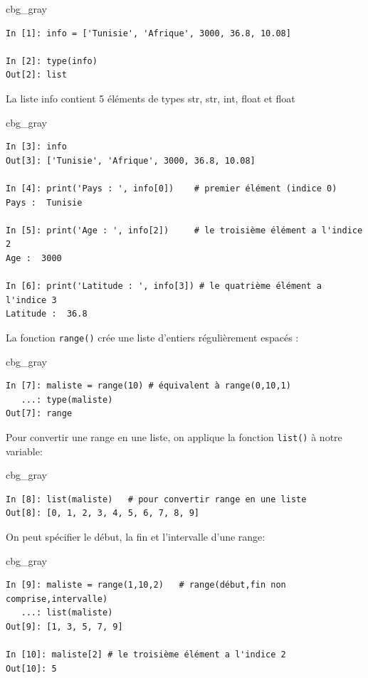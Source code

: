 \documentclass[%
oneside,                 %
final,                   %
10pt]{article}
\newenvironment{_cod_tight}[1]{
   \def\FrameCommand{\colorbox{#1}}
   \FrameRule0.6pt\MakeFramed {\FrameRestore}\vskip3mm}
   {\vskip0mm\endMakeFramed}
\newenvironment{cod}[1]{
\bgroup\rmfamily
\fboxsep=0mm\relax
\begin{_cod_tight}{#1}
\list{}{\parsep=-2mm\parskip=0mm\topsep=0pt\leftmargin=2mm
\rightmargin=2\leftmargin\leftmargin=4pt\relax}
\item\relax}
{\endlist\end{_cod_tight}\egroup}
\begin{document}
\begin{cod}{cbg_gray}\begin{verbatim}
In [1]: info = ['Tunisie', 'Afrique', 3000, 36.8, 10.08]

In [2]: type(info)
Out[2]: list
\end{verbatim}
\end{cod}
\noindent
La liste info contient 5 éléments de types str, str, int, float et float

\begin{cod}{cbg_gray}\begin{verbatim}
In [3]: info
Out[3]: ['Tunisie', 'Afrique', 3000, 36.8, 10.08]

In [4]: print('Pays : ', info[0])    # premier élément (indice 0)
Pays :  Tunisie

In [5]: print('Age : ', info[2])     # le troisième élément a l'indice 2
Age :  3000

In [6]: print('Latitude : ', info[3]) # le quatrième élément a l'indice 3
Latitude :  36.8
\end{verbatim}
\end{cod}
\noindent

La fonction \texttt{range()} crée une liste d'entiers régulièrement espacés :

\begin{cod}{cbg_gray}\begin{verbatim}
In [7]: maliste = range(10) # équivalent à range(0,10,1)
   ...: type(maliste)
Out[7]: range
\end{verbatim}
\end{cod}
\noindent
Pour convertir une range en une liste, on applique la fonction \texttt{list()} à notre variable:
\begin{cod}{cbg_gray}\begin{verbatim}
In [8]: list(maliste)   # pour convertir range en une liste
Out[8]: [0, 1, 2, 3, 4, 5, 6, 7, 8, 9]
\end{verbatim}
\end{cod}
\noindent
On peut spécifier le début, la fin et l'intervalle d'une range:
\begin{cod}{cbg_gray}\begin{verbatim}
In [9]: maliste = range(1,10,2)   # range(début,fin non comprise,intervalle)
   ...: list(maliste)
Out[9]: [1, 3, 5, 7, 9]

In [10]: maliste[2] # le troisième élément a l'indice 2
Out[10]: 5
\end{verbatim}
\end{cod}
\noindent
\end{document}
